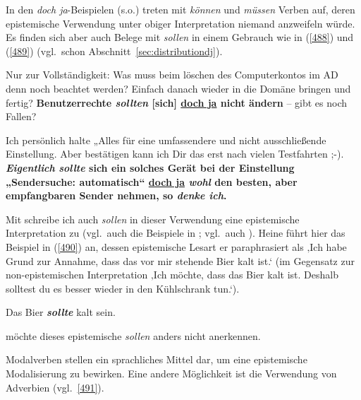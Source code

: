 In den \textit{doch ja}-Beispielen (s.o.) treten mit \textit{können} und \textit{müssen} Verben auf, deren epistemische Verwendung unter obiger Interpretation niemand anzweifeln würde. Es finden sich aber auch Belege mit \textit{sollen} in einem Gebrauch wie in (\ref{488}) und (\ref{489}) (vgl.\ schon Abschnitt~\ref{sec:distributiondj}).

\begin{exe}
	\ex\label{488} 

	Nur zur Vollständigkeit: Was muss beim löschen des Computerkontos im AD denn noch beachtet werden? Einfach danach wieder in die Domäne bringen und fertig? \textbf{Benutzerrechte \textit{sollten} [sich] \underline{doch ja} nicht ändern} – gibt es noch Fallen?
\end{exe}

\begin{exe}
	\ex\label{489} 

	Ich persönlich halte „Alles für eine umfassendere und nicht ausschließende Einstellung. Aber bestätigen kann ich Dir das erst nach vielen Testfahrten ;-). \textbf{\textit{Eigentlich} \textit{sollte} sich ein solches Gerät bei der Einstellung „Sendersuche: automatisch“ \underline{doch ja} \textit{wohl} den besten, aber empfangbaren Sender nehmen, so \textit{denke ich}.}
\end{exe}
Mit \citet[33]{Heine1995} schreibe ich auch \textit{sollen} in dieser Verwendung eine epistemische Interpretation zu (vgl.\ auch die Beispiele in \citealt[350]{Loetscher1991}; vgl.\ auch \citealt[27, Fn 4]{Mache2009}). Heine führt hier das Beispiel in (\ref{490}) an, dessen epistemische Lesart er paraphrasiert als ‚Ich habe Grund zur Annahme, dass das vor mir stehende Bier kalt ist.‘  (im Gegensatz zur non-epistemischen Interpretation ‚Ich möchte, dass das Bier kalt ist. Deshalb solltest du es besser wieder in den Kühlschrank tun.‘).

\begin{exe}
	\ex\label{490} 
	Das Bier \textbf{\textit{sollte}} kalt sein.
\end{exe}
\citet[202, Fn~32--34]{Diewald1999b} möchte dieses epistemische \textit{sollen} anders nicht anerkennen.

Modalverben stellen ein  sprachliches Mittel dar, um eine epistemische Modalisierung zu bewirken. Eine andere Möglichkeit ist die Verwendung von  Adverbien (vgl.\ \ref{491}).

